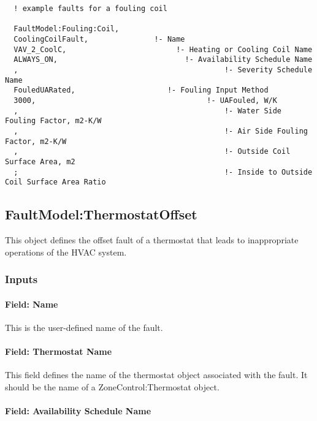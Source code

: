 \begin{lstlisting}
  ! example faults for a fouling coil

  FaultModel:Fouling:Coil,
  CoolingCoilFault,               !- Name
  VAV_2_CoolC,                         !- Heating or Cooling Coil Name
  ALWAYS_ON,                             !- Availability Schedule Name
  ,                                               !- Severity Schedule Name
  FouledUARated,                     !- Fouling Input Method
  3000,                                       !- UAFouled, W/K
  ,                                               !- Water Side Fouling Factor, m2-K/W
  ,                                               !- Air Side Fouling Factor, m2-K/W
  ,                                               !- Outside Coil Surface Area, m2
  ;                                               !- Inside to Outside Coil Surface Area Ratio
\end{lstlisting}

\subsection{FaultModel:ThermostatOffset}\label{faultmodelthermostatoffset}

This object defines the offset fault of a thermostat that leads to inappropriate operations of the HVAC system.

\subsubsection{Inputs}\label{inputs-6-015}

\paragraph{Field: Name}\label{field-name-6-012}

This is the user-defined name of the fault.

\paragraph{Field: Thermostat Name}\label{field-thermostat-name}

This field defines the name of the thermostat object associated with the fault. It should be the name of a ZoneControl:Thermostat object.

\paragraph{Field: Availability Schedule Name}\label{field-availability-schedule-name-6-002}


